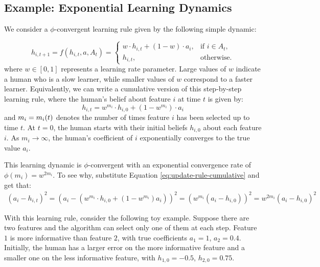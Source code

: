 \subsection{Example: Exponential Learning Dynamics} \label{sec:example-learning}

We consider
a $\phi$-convergent learning rule given by the following simple dynamic: 


 
\begin{equation} \label{eq:update-rule}
h_{i, t+1} = f(h_{i,t}, a, A_t) =
\begin{cases} 
w \cdot h_{i,t} + (1 - w) \cdot a_i, & \text{if } i \in A_t, \\
h_{i,t}, & \text{otherwise.}
\end{cases}
\end{equation}
where $w \in [0,1]$ represents a learning rate parameter. {Large values of $w$ indicate a human who is a slow learner, while smaller values of $w$ correspond to a faster learner.}
Equivalently, we can write a cumulative version of this step-by-step learning rule, where the human's belief about feature $i$ at time $t$ is given by:
\begin{equation} \label{eq:update-rule-cumulative}
     h_{i,t} = w^{m_i} \cdot h_{i,0}  + (1 - w^{m_i}) \cdot a_i
\end{equation}
and $m_i=m_{i}(t)$ denotes the number of times feature $i$ has been selected up to time $t$. At $t=0$, the human starts with their initial beliefs $h_{i,0}$ about each feature $i$. As $m_i \rightarrow \infty$, the human's coefficient of $i$ exponentially converges to the true value $a_i$.


This learning dynamic is $\phi$-convergent with an exponential convergence rate of $\phi(m_i) = w^{2m_i}$. To see why, 
substitute Equation \eqref{eq:update-rule-cumulative} 
and get that:
\begin{align*}
 (a_i-h_{i,t})^2 = (a_i - (w^{m_i} \cdot h_{i,0} + (1-w^{m_i}) a_i))^2 = (w^{m_i}(a_i-h_{i,0}))^2 = w^{2m_i}(a_i-h_{i,0})^2
\end{align*}

 
 With this learning rule, consider the following toy example. Suppose there are two features and the algorithm can select only one of them at each step. Feature $1$ is more informative than feature $2$, with true coefficients $a_1=1$, $a_2=0.4$.  Initially, the human has a larger error on the more informative feature and a smaller one on the less informative feature, with $h_{1,0} = -0.5$, $h_{2,0} = 0.75$. %


